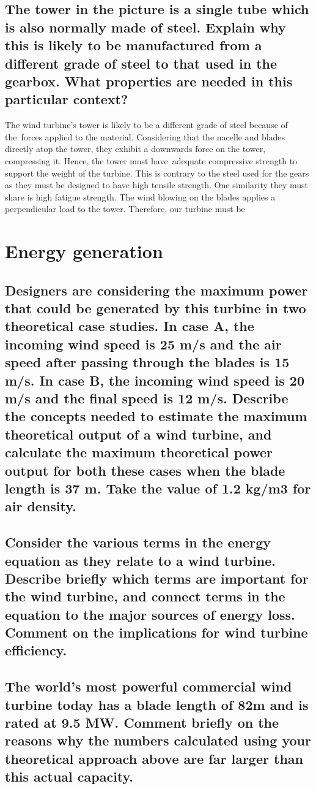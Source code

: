 \documentclass[12pt]{article}
\numberwithin{equation}{section}
\begin{document}
\begin{flushleft}
\subsection{The tower in the picture is a single tube which is also normally made of steel. Explain why this is likely to be manufactured from a different grade of steel to that used in the gearbox. What properties are needed in this particular context?}
The wind turbine’s tower is likely to be a different grade of steel because of the forces applied to the material. Considering that the nacelle and blades directly atop the tower, they exhibit a downwards force on the tower, compressing it. Hence, the tower must have adequate compressive strength to support the weight of the turbine. This is contrary to the steel used for the gears as they must be designed to have high tensile strength. One similarity they must share is high fatigue strength. The wind blowing on the blades applies a perpendicular load to the tower. Therefore, our turbine must be

\section{Energy generation}
\subsection{Designers are considering the maximum power that could be generated by this turbine in two theoretical case studies. In case A, the incoming wind speed is 25 m/s and the air speed after passing through the blades is 15 m/s. In case B, the incoming wind speed is 20 m/s and the final speed is 12 m/s. Describe the concepts needed to estimate the maximum theoretical output of a wind turbine, and calculate the maximum theoretical power output for both these cases when the blade length is 37 m. Take the value of 1.2 kg/m3 for air density.}

\subsection{Consider the various terms in the energy equation as they relate to a wind turbine. Describe briefly which terms are important for the wind turbine, and connect terms in the equation to the major sources of energy loss. Comment on the implications for wind turbine efficiency.}
\subsection{The world’s most powerful commercial wind turbine today has a blade length of 82m and is rated at 9.5 MW. Comment briefly on the reasons why the numbers calculated using your theoretical approach above are far larger than this actual capacity.}


\end{flushleft}
\end{document}
